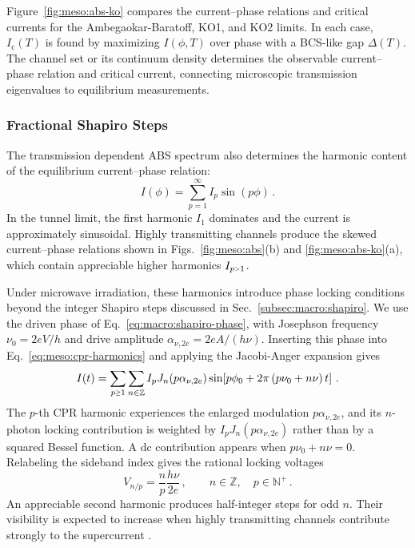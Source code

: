             Figure~\ref{fig:meso:abs-ko} compares the current--phase relations and critical currents for the Ambegaokar-Baratoff, KO1, and KO2 limits. In each case, $I_\mathrm{c}(T)$ is found by maximizing $I(\phi,T)$ over phase with a BCS-like gap $\Delta(T)$. The channel set or its continuum density determines the observable current--phase relation and critical current, connecting microscopic transmission eigenvalues to equilibrium measurements.

        \subsubsection*{Fractional Shapiro Steps}

            The transmission dependent ABS spectrum also determines the harmonic content of the equilibrium current--phase relation:
            \begin{equation}
                I(\phi)=\sum_{p=1}^{\infty} I_p\sin(p\phi)\,.
                \label{eq:meso:cpr-harmonics}
            \end{equation}
            In the tunnel limit, the first harmonic $I_1$ dominates and the current is approximately sinusoidal. Highly transmitting channels produce the skewed current--phase relations shown in Figs.~\ref{fig:meso:abs}(b) and \ref{fig:meso:abs-ko}(a), which contain appreciable higher harmonics $I_{p\sgt{}1}$.

            Under microwave irradiation, these harmonics introduce phase locking conditions beyond the integer Shapiro steps discussed in Sec.~\ref{subsec:macro:shapiro}. We use the driven phase of Eq.~\eqref{eq:macro:shapiro-phase}, with Josephson frequency $\nu_0=2eV/h$ and drive amplitude $\alpha_{\nu,2e}=2eA/(h\nu)$. Inserting this phase into Eq.~\eqref{eq:meso:cpr-harmonics} and applying the Jacobi-Anger expansion gives
            \begin{equation}
                I(t)=\sum_{p\sgeq{}1}\sum_{n\in\mathbb{Z}} I_pJ_n(p\alpha_{\nu,2e})
                \sin\!\left[p\phi_0+2\pi\left(p\nu_0+n\nu\right)t\right]\,.
            \end{equation}
            The $p$-th CPR harmonic experiences the enlarged modulation $p\alpha_{\nu,2e}$, and its $n$-photon locking contribution is weighted by $I_pJ_n(p\alpha_{\nu,2e})$ rather than by a squared Bessel function. A dc contribution appears when $p\nu_0+n\nu=0$. Relabeling the sideband index gives the rational locking voltages
            \begin{equation}
                V_{n/p}=\frac{n}{p}\frac{h\nu}{2e}\,,\qquad n\in\mathbb{Z},\quad p\in\mathbb{N}^+\,.
            \end{equation}
            An appreciable second harmonic produces half-integer steps for odd $n$. Their visibility is expected to increase when highly transmitting channels contribute strongly to the supercurrent \cite{cuevas_subharmonic_2002,duprat_phase_2005,chauvin_superconducting_2006}.

